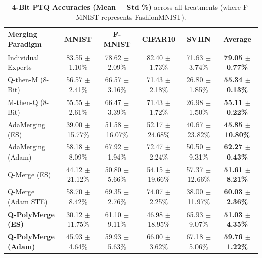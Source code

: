 \begin{table}[t]
\centering
\setlength{\tabcolsep}{2.5pt}
\begin{minipage}{0.49\textwidth}
\centering
\caption{\textbf{8-Bit PTQ Accuracies (Mean $\pm$ Std \%)} across all treatments (where F-MNIST represents FashionMNIST).}
\label{tab:8bit_results}
\vskip 0.1in
\begin{scriptsize}
\begin{sc}
\begin{tabular}{lccccc}
\toprule
Merging Paradigm & MNIST & F-MNIST & CIFAR10 & SVHN & Average \\
\midrule
Individual Experts & 83.55 $\pm$ 1.10\% & 78.62 $\pm$ 2.09\% & 82.40 $\pm$ 1.73\% & 71.63 $\pm$ 3.74\% & \textbf{79.05 $\pm$ 0.77\%} \\
Q-then-M (8-Bit) & 56.57 $\pm$ 2.41\% & 66.57 $\pm$ 3.16\% & 71.43 $\pm$ 2.18\% & 26.80 $\pm$ 1.85\% & \textbf{55.34 $\pm$ 0.13\%} \\
M-then-Q (8-Bit) & 55.55 $\pm$ 2.61\% & 66.47 $\pm$ 3.39\% & 71.43 $\pm$ 1.72\% & 26.98 $\pm$ 1.50\% & \textbf{55.11 $\pm$ 0.22\%} \\
AdaMerging (ES) & 39.00 $\pm$ 15.77\% & 51.58 $\pm$ 16.07\% & 52.17 $\pm$ 24.68\% & 40.67 $\pm$ 23.82\% & \textbf{45.85 $\pm$ 10.80\%} \\
AdaMerging (Adam) & 58.18 $\pm$ 8.09\% & 67.92 $\pm$ 1.94\% & 72.47 $\pm$ 2.24\% & 50.50 $\pm$ 9.31\% & \textbf{62.27 $\pm$ 0.43\%} \\
Q-Merge (ES) & 44.12 $\pm$ 21.12\% & 50.80 $\pm$ 5.66\% & 54.15 $\pm$ 19.66\% & 57.37 $\pm$ 12.66\% & \textbf{51.61 $\pm$ 8.21\%} \\
Q-Merge (Adam STE) & 58.70 $\pm$ 8.42\% & 69.35 $\pm$ 2.76\% & 74.07 $\pm$ 2.25\% & 38.00 $\pm$ 11.97\% & \textbf{60.03 $\pm$ 2.36\%} \\
\midrule
\textbf{Q-PolyMerge (ES)} & 30.12 $\pm$ 11.75\% & 61.10 $\pm$ 9.11\% & 46.98 $\pm$ 18.95\% & 65.93 $\pm$ 9.07\% & \textbf{51.03 $\pm$ 4.35\%} \\
\textbf{Q-PolyMerge (Adam)} & 45.93 $\pm$ 4.64\% & 59.93 $\pm$ 5.63\% & 66.00 $\pm$ 3.62\% & 67.18 $\pm$ 5.06\% & \textbf{59.76 $\pm$ 1.22\%} \\
\bottomrule
\end{tabular}
\end{sc}
\end{scriptsize}
\end{minipage}
\hfill
\begin{minipage}{0.49\textwidth}
\centering
\caption{\textbf{4-Bit PTQ Accuracies (Mean $\pm$ Std \%)} across all treatments (where F-MNIST represents FashionMNIST).}

\end{minipage}
\end{table}
